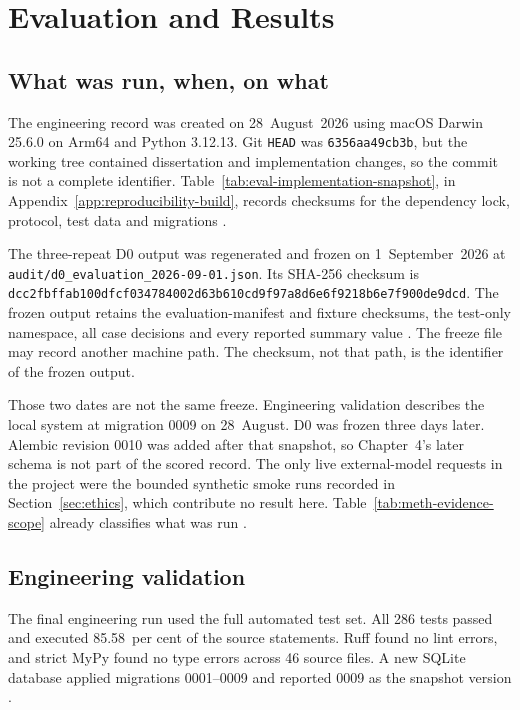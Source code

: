 \chapter{Evaluation and Results}
\section{What was run, when, on what}

The engineering record was created on 28~August~2026 using macOS Darwin 25.6.0 on Arm64 and Python
3.12.13. Git \texttt{HEAD} was \texttt{6356aa49cb3b}, but the working tree contained dissertation and
implementation changes, so the commit is not a complete identifier.
Table~\ref{tab:eval-implementation-snapshot}, in Appendix~\ref{app:reproducibility-build}, records
checksums for the dependency lock, protocol, test data and migrations
\citep{pineau2021reproducibility,gebru2021datasheets}.

The three-repeat D0 output was regenerated and frozen on 1~September~2026 at
\nolinkurl{audit/d0_evaluation_2026-09-01.json}. Its SHA-256 checksum is
\nolinkurl{dcc2fbffab100dfcf034784002d63b610cd9f97a8d6e6f9218b6e7f900de9dcd}.
The frozen output retains the evaluation-manifest and fixture checksums, the test-only namespace, all
case decisions and every reported summary value
\citep{pineau2021reproducibility,mitchell2019modelcards}. The freeze file may record another
machine path. The checksum, not that path, is the identifier of the frozen output.

Those two dates are not the same freeze. Engineering validation describes the local system at
migration 0009 on 28~August. D0 was frozen three days later. Alembic revision 0010 was added after
that snapshot, so Chapter~4's later schema is not part of the scored record. The only live
external-model requests in the project were the bounded synthetic smoke runs recorded in
Section~\ref{sec:ethics}, which contribute no result here. Table~\ref{tab:meth-evidence-scope}
already classifies what was run \citep{hevner2004design,peffers2007dsrm}.

\section{Engineering validation}

The final engineering run used the full automated test set. All 286 tests passed and executed
85.58~per cent of the source statements. Ruff found no lint errors, and strict MyPy found no type
errors across 46 source files. A new SQLite database applied migrations 0001--0009 and reported 0009
as the snapshot version \citep{pineau2021reproducibility,nist2023airmf}.

